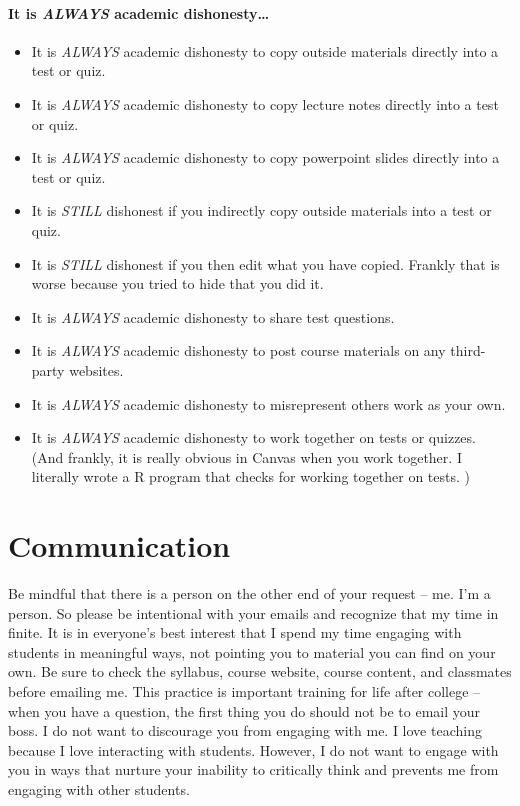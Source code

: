 \documentclass[
]{book}
\begin{document}
\subsubsection{\texorpdfstring{It is \emph{ALWAYS} academic dishonesty\ldots{}}{It is ALWAYS academic dishonesty\ldots{}}}\label{it-is-always-academic-dishonesty}

\begin{itemize}
\item
  It is \emph{ALWAYS} academic dishonesty to copy outside materials directly into a test or quiz.
\item
  It is \emph{ALWAYS} academic dishonesty to copy lecture notes directly into a test or quiz.
\item
  It is \emph{ALWAYS} academic dishonesty to copy powerpoint slides directly into a test or quiz.
\item
  It is \emph{STILL} dishonest if you indirectly copy outside materials into a test or quiz.
\item
  It is \emph{STILL} dishonest if you then edit what you have copied. Frankly that is worse because you tried to hide that you did it.
\item
  It is \emph{ALWAYS} academic dishonesty to share test questions.
\item
  It is \emph{ALWAYS} academic dishonesty to post course materials on any third-party websites.
\item
  It is \emph{ALWAYS} academic dishonesty to misrepresent others work as your own.
\item
  It is \emph{ALWAYS} academic dishonesty to work together on tests or quizzes. (And frankly, it is really obvious in Canvas when you work together. I literally wrote a R program that checks for working together on tests. )
\end{itemize}

\chapter{Communication}\label{communication}

Be mindful that there is a person on the other end of your request -- me. I'm a person. So please be intentional with your emails and recognize that my time in finite. It is in everyone's best interest that I spend my time engaging with students in meaningful ways, not pointing you to material you can find on your own. Be sure to check the syllabus, course website, course content, and classmates before emailing me. This practice is important training for life after college -- when you have a question, the first thing you do should not be to email your boss. I do not want to discourage you from engaging with me. I love teaching because I love interacting with students. However, I do not want to engage with you in ways that nurture your inability to critically think and prevents me from engaging with other students.
\end{document}
